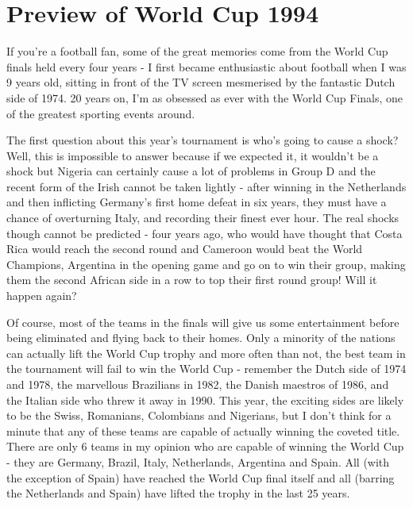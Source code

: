 \chapter{Preview of World Cup 1994}
\newline
\newline
If you're a football fan, some of the great memories come from the World Cup 
finals held every four years - I first became enthusiastic about football when
I was 9 years old, sitting in front of the TV screen mesmerised by the 
fantastic Dutch side of 1974. 20 years on, I'm as obsessed as ever with the 
World Cup Finals, one of the greatest sporting events around.

The first question about this year's tournament is who's going to cause a 
shock? Well, this is impossible to answer because if we expected it, it 
wouldn't be a shock but Nigeria can certainly cause a lot of problems in Group 
D and the recent form of the Irish cannot be taken lightly - after winning in 
the Netherlands and then inflicting Germany's first home defeat in six years, 
they must have a chance of overturning Italy, and recording their finest ever 
hour. The real shocks though cannot be predicted - four years ago, who would 
have thought that Costa Rica would reach the second round and Cameroon would 
beat the World Champions, Argentina in the opening game and go on to win their 
group, making them the second African side in a row to top their first round 
group! Will it happen again?

Of course, most of the teams in the finals will give us some entertainment 
before being eliminated and flying back to their homes. Only a minority of the
nations can actually lift the World Cup trophy and more often than not, the 
best team in the tournament will fail to win the World Cup - remember the
Dutch side of 1974 and 1978, the marvellous Brazilians in 1982, the Danish
maestros of 1986, and the Italian side who threw it away in 1990. This year,
the exciting sides are likely to be the Swiss, Romanians, Colombians and
Nigerians, but I don't think for a minute that any of these teams are capable 
of actually winning the coveted title. There are only 6 teams in my opinion
who are capable of winning the World Cup - they are Germany, Brazil, Italy,
Netherlands, Argentina and Spain. All (with the exception of Spain) have 
reached the World Cup final itself and all (barring the Netherlands and Spain) 
have lifted the trophy in the last 25 years.

